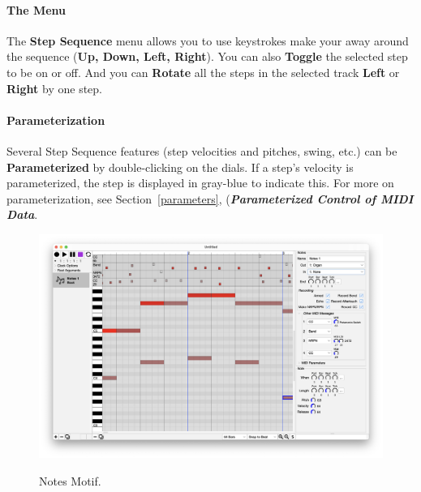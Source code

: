 \documentclass[twoside,10pt]{article}
\newcommand\ignore[1]{}
\begin{document}
\paragraph{The Menu}

The {\bf Step Sequence} menu allows you to use keystrokes make your away around the sequence ({\bf Up, Down, Left, Right}).  You can also {\bf Toggle} the selected step to be on or off.  And you can {\bf Rotate} all the steps in the selected track {\bf Left} or {\bf Right} by one step.

\ignore{
\paragraph{Recording a Step Sequence}

If you arm one or more Tracks, set their Notes, and set the Sequence's MIDI Input accordingly, then you can record in Notes to those tracks when you press Record on Seq.   You will find this easier if you turn on the metronome and if you set the Step Sequence to be the Root, so it records immediately.  Remember that if your Step Sequence motif is not a descendant of the Root, it will never be reached to do Recording.
}

\paragraph{Parameterization}

Several Step Sequence features (step velocities and pitches, swing, etc.) can be {\bf Parameterized} by double-clicking on the dials.  If a step's velocity is parameterized, the step is displayed in gray-blue to indicate this.  For more on parameterization, see Section~\ref{parameters}, (\textbf{\textit{Parameterized Control of MIDI Data}}.


\clearpage

\begin{figure}[t]
\centering
\includegraphics[alt={yo},width=6.5in]{Notes}
\vspace{-2em}
\caption{Notes Motif.}
\label{notes}
\end{figure}
\end{document}

